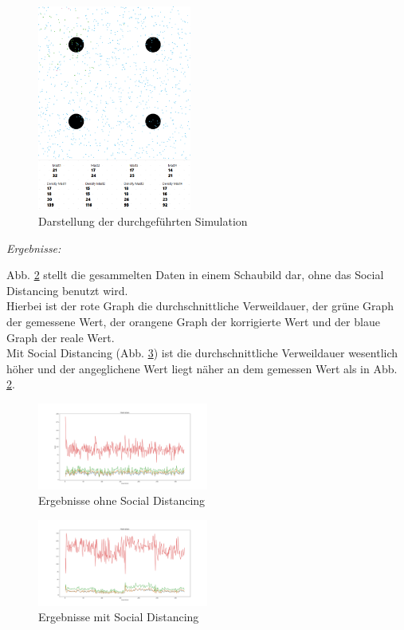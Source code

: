 \documentclass[conference]{IEEEtran}
\begin{document}
\begin{figure}[h]
	\centering
	\includegraphics[width=0.45\textwidth]{"Simulation"}
	\caption{Darstellung der durchgeführten Simulation}
	\label{sim}
\end{figure}

\textit{Ergebnisse:}

Abb. \ref{mast_data_plotted_old} stellt die gesammelten Daten in einem Schaubild dar, ohne das Social Distancing benutzt wird.\\
Hierbei ist der rote Graph die durchschnittliche Verweildauer, der grüne Graph der gemessene Wert, der orangene Graph der korrigierte Wert und der blaue Graph der reale Wert.\\
Mit Social Distancing (Abb. \ref{mast_data_plotted_social_distancing_old}) ist die durchschnittliche Verweildauer wesentlich höher und der angeglichene Wert liegt näher an dem gemessen Wert als in Abb. \ref{mast_data_plotted_old}.

\begin{figure}[h]
	\centering
	\includegraphics[width=0.5\textwidth]{"Mast_Data_Plotted_old"}
	\caption{Ergebnisse ohne Social Distancing}
	\label{mast_data_plotted_old}
\end{figure}

\begin{figure}[h]
	\centering
	\includegraphics[width=0.5\textwidth]{"Mast_Data_Plotted_Social_Distancing_old"}
	\caption{Ergebnisse mit Social Distancing}
	\label{mast_data_plotted_social_distancing_old}
\end{figure}
\end{document}
